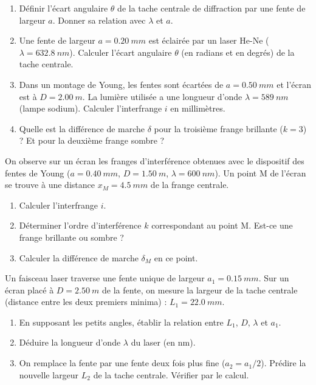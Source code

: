\documentclass[11pt]{article}
\newcounter{popsec}
\newcounter{popsub}
\newcommand{\courssub}[1]{%
  \stepcounter{popsub}%
  \par\vspace{9pt}\noindent{\popxbold\fontsize{11.5}{13}\selectfont\color{popink}{\color{poporange}\thepopsec.\thepopsub}\hspace{6pt}#1}\par\nopagebreak\vspace{4pt}
}
\begin{document}
\begin{exercice}
\begin{enumerate}
    \item Définir l'écart angulaire $\theta$ de la tache centrale de diffraction par une fente de largeur $a$. Donner sa relation avec $\lambda$ et $a$.
    \item Une fente de largeur $a = \SI{0,20}{mm}$ est éclairée par un laser He-Ne ($\lambda = \SI{632,8}{nm}$). Calculer l'écart angulaire $\theta$ (en radians et en degrés) de la tache centrale.
    \item Dans un montage de Young, les fentes sont écartées de $a = \SI{0,50}{mm}$ et l'écran est à $D = \SI{2,00}{m}$. La lumière utilisée a une longueur d'onde $\lambda = \SI{589}{nm}$ (lampe sodium). Calculer l'interfrange $i$ en millimètres.
    \item Quelle est la différence de marche $\delta$ pour la troisième frange brillante ($k=3$) ? Et pour la deuxième frange sombre ?
\end{enumerate}
\end{exercice}

\begin{exercice}
On observe sur un écran les franges d'interférence obtenues avec le dispositif des fentes de Young ($a = \SI{0,40}{mm}$, $D = \SI{1,50}{m}$, $\lambda = \SI{600}{nm}$). Un point M de l'écran se trouve à une distance $x_M = \SI{4,5}{mm}$ de la frange centrale.
\begin{enumerate}
    \item Calculer l'interfrange $i$.
    \item Déterminer l'ordre d'interférence $k$ correspondant au point M. Est-ce une frange brillante ou sombre ?
    \item Calculer la différence de marche $\delta_M$ en ce point.
\end{enumerate}
\end{exercice}

\courssub{Je m'entraîne}

\begin{exercice}
Un faisceau laser traverse une fente unique de largeur $a_1 = \SI{0,15}{mm}$. Sur un écran placé à $D = \SI{2,50}{m}$ de la fente, on mesure la largeur de la tache centrale (distance entre les deux premiers minima) : $L_1 = \SI{22,0}{mm}$.
\begin{enumerate}
    \item En supposant les petits angles, établir la relation entre $L_1$, $D$, $\lambda$ et $a_1$.
    \item Déduire la longueur d'onde $\lambda$ du laser (en nm).
    \item On remplace la fente par une fente deux fois plus fine ($a_2 = a_1/2$). Prédire la nouvelle largeur $L_2$ de la tache centrale. Vérifier par le calcul.
\end{enumerate}
\end{exercice}
\end{document}
